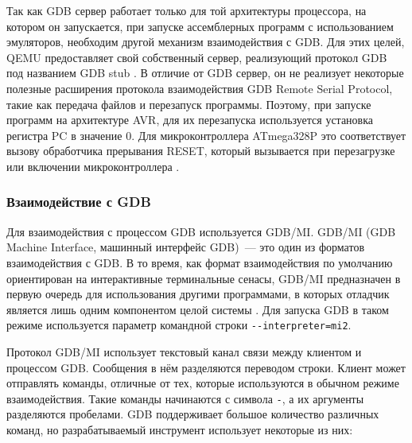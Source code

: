\documentclass[a4paper,article,14pt]{extarticle}
\begin{document}
Так как GDB сервер работает только для той архитектуры процессора, на котором он запускается, при запуске ассемблерных программ с использованием эмуляторов, необходим другой механизм взаимодействия с GDB. Для этих целей, QEMU предоставляет свой собственный сервер, реализующий протокол GDB под названием GDB stub \cite{gdbstub}. В отличие от GDB сервер, он не реализует некоторые полезные расширения протокола взаимодействия GDB Remote Serial Protocol, такие как передача файлов и перезапуск программы. Поэтому, при запуске программ на архитектуре AVR, для их перезапуска используется установка регистра PC в значение 0. Для микроконтроллера ATmega328P это соответствует вызову обработчика прерывания RESET, который вызывается при перезагрузке или включении микроконтроллера \cite{atmega328p}.

\subsubsection{Взаимодействие с GDB}

Для взаимодействия с процессом GDB используется GDB/MI. GDB/MI (GDB Machine Interface, машинный интерфейс GDB)~--- это один из форматов взаимодействия с GDB. В то время, как формат взаимодействия по умолчанию ориентирован на интерактивные терминальные сенасы, GDB/MI предназначен в первую очередь для использования другими программами, в которых отладчик является лишь одним компонентом целой системы \cite{gdb}. Для запуска GDB в таком режиме используется параметр командной строки \texttt{-{}-interpreter=mi2}.

Протокол GDB/MI использует текстовый канал связи между клиентом и процессом GDB. Сообщения в нём разделяются переводом строки. Клиент может отправлять команды, отличные от тех, которые используются в обычном режиме взаимодействия. Такие команды начинаются с символа \texttt{-}, а их аргументы разделяются пробелами. GDB поддерживает большое количество различных команд, но разрабатываемый инструмент использует некоторые из них:
\end{document}
